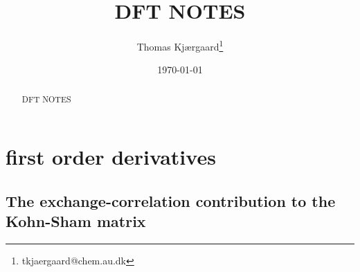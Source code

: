 \documentclass[preprint,preprintnumbers,amsmath,amssymb,11pt]{revtex4}
\begin{document}
\title{DFT NOTES}

\author{Thomas Kj{\ae}rgaard\footnote{tkjaergaard@chem.au.dk}}

\date{\today}

\begin{abstract}

DFT NOTES 

\end{abstract}

\maketitle

\newpage

\section{first order derivatives}
\subsection{The exchange-correlation contribution to the Kohn-Sham matrix}
\label{ExcDer}
\end{document}
